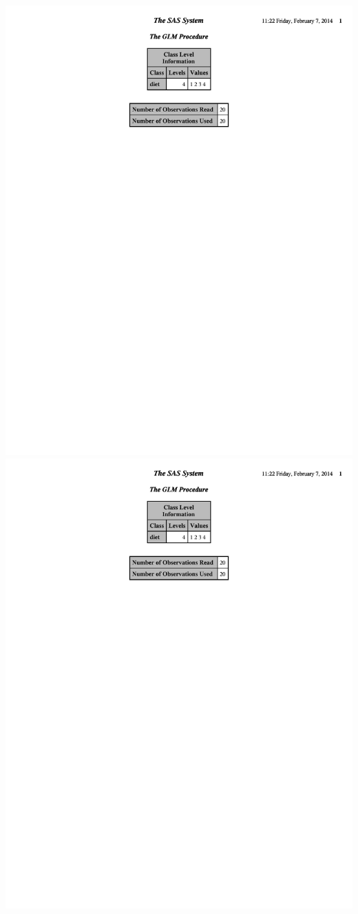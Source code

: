 \begin{center}
\includegraphics[page=2,scale=0.8,trim = 5mm 120mm 5mm 20mm]{DietsANCOVA}
\includegraphics[page=3,scale=0.6,trim = 5mm 150mm 5mm 5mm]{DietsANCOVA}
\end{center}

